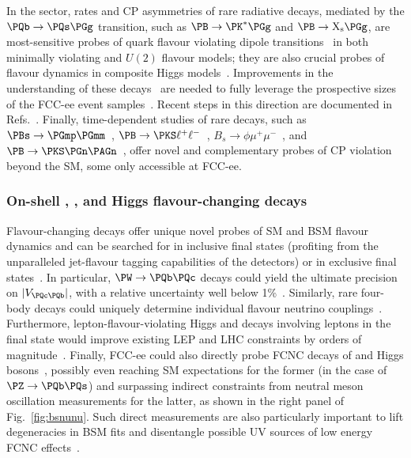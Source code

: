 In the \PB sector, rates and CP asymmetries of rare radiative decays, mediated by the $\PQb \to \PQs \PGg$ transition, 
such as $\PB \to \PK^* \PGg$ and $\PB \to \mathrm{X_s} \PGg$, 
are most-sensitive probes of quark flavour violating dipole transitions~\cite{Fajfer:2023gie} 
in both minimally violating and $U(2)$ flavour models;
they are also crucial probes of flavour dynamics in composite Higgs models~\cite{Glioti:2024hye}. 
Improvements in the understanding of these decays~\cite{Benzke:2010tq, Paul:2016urs} 
are needed to fully leverage the prospective sizes of the FCC-ee event samples~\cite{BKgamma}. 
Recent steps in this direction are documented in Refs.~\cite{Gunawardana:2019gep,Misiak:2020vlo}.
Finally, time-dependent studies of rare decays, 
such as $\PBs \to \PGmp \PGmm$~\cite{Buras:2013uqa, Fleischer:2017yox}, 
$\PB \to \PKS \ell^+ \ell^-$~\cite{Descotes-Genon:2020tnz, Fleischer:2022klb}, $B_s \to \phi \mu^+\mu^-$~\cite{Kwok2024},
and $\PB \to \PKS \PGn\PAGn$~\cite{Descotes-Genon:2022gcp}, 
offer novel and complementary probes of CP violation beyond the SM, 
some only accessible at FCC-ee.     

\subsubsection{On-shell \texorpdfstring{\PZ}{Z}, \texorpdfstring{\PW}{W}, and Higgs flavour-changing decays}

Flavour-changing decays offer unique novel probes of SM and BSM flavour dynamics 
and can be searched for in inclusive final states 
(profiting from the unparalleled jet-flavour tagging capabilities of the detectors) 
or in exclusive final states~\cite{dEnterria:2023wjq}. 
In particular, $\PW \to \PQb \PQc$ decays could yield the ultimate precision on $|V_{\PQc\PQb}|$, 
with a relative uncertainty well below 1\%~\cite{WWVcb,WWVcb2}. 
Similarly, rare four-body \PZ decays could uniquely determine individual flavour neutrino couplings~\cite{Durieux:2015hsi}.
Furthermore, lepton-flavour-violating Higgs and \PZ decays involving \PGt leptons in the final state 
would improve existing LEP and LHC constraints by orders of magnitude~\cite{Abada:2014cca, Qin:2017aju, Dam:2021ibi}. 
Finally, FCC-ee could also directly probe FCNC decays of \PZ and Higgs bosons~\cite{Kamenik:2023hvi}, 
possibly even reaching SM expectations for the former (in the case of $\PZ \to \PQb\PQs$) 
and surpassing indirect constraints from neutral meson oscillation measurements for the latter, 
as shown in the right panel of Fig.~\ref{fig:bsnunu}. 
Such direct measurements are also particularly important to lift degeneracies in BSM fits 
and disentangle possible UV sources of low energy FCNC effects~\cite{Crivellin:2022rhw}. 

